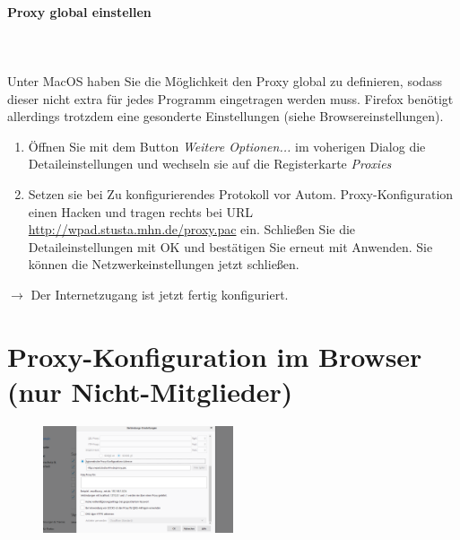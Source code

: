 \documentclass[a4paper,12pt]{scrartcl}
\begin{document}
\paragraph*{Proxy global einstellen}~\\
\\
Unter MacOS haben Sie die Möglichkeit den Proxy global zu definieren, sodass dieser nicht extra für jedes Programm eingetragen werden muss. Firefox benötigt allerdings trotzdem eine gesonderte Einstellungen (siehe Browsereinstellungen). %

\begin{enumerate}%
    \item Öffnen Sie mit dem Button \emph{Weitere Optionen...} im voherigen Dialog die Detaileinstellungen und wechseln sie auf die Registerkarte \emph{Proxies}
    \item Setzen sie bei Zu konfigurierendes Protokoll vor Autom. Proxy-Konfiguration einen Hacken und tragen rechts bei URL \url{http://wpad.stusta.mhn.de/proxy.pac} ein. Schließen Sie die Detaileinstellungen mit OK und bestätigen Sie erneut mit Anwenden. Sie können die Netzwerkeinstellungen jetzt schließen.
\end{enumerate}
$\rightarrow$ Der Internetzugang ist jetzt fertig konfiguriert.

\newpage

\section*{Proxy-Konfiguration im Browser (nur Nicht-Mitglieder)}
\label{Proxy}

\begin{figure}
	\vspace{-40pt}
	\begin{center}
		\includegraphics[width=0.5\textwidth,keepaspectratio]{Bilder/Firefox_neu_proxy}
	\end{center}
\end{figure}
\end{document}
